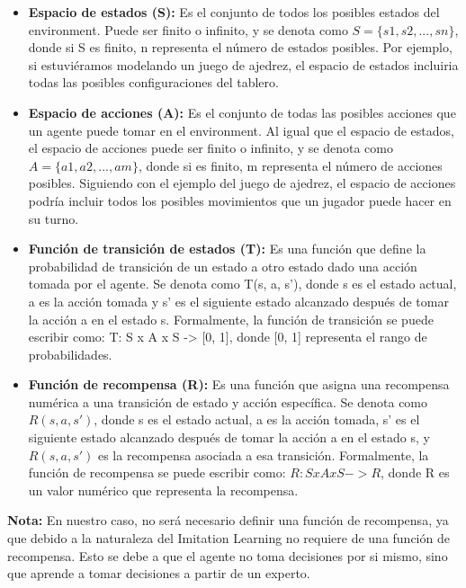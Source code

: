 \begin{itemize}
    \item \textbf{Espacio de estados (S):} Es el conjunto de todos los posibles estados del environment. 
    Puede ser finito o infinito, y se denota como $S = \{s1, s2, ..., sn\}$, donde si S es finito, n representa 
    el número de estados posibles. Por ejemplo, si estuviéramos modelando un juego de ajedrez, el espacio 
    de estados incluiria todas las posibles configuraciones del tablero.

    \item \textbf{Espacio de acciones (A):} Es el conjunto de todas las posibles acciones que un agente 
    puede tomar en el environment. Al igual que el espacio de estados, el espacio de acciones puede ser finito 
    o infinito, y se denota como $A = \{a1, a2, ..., am\}$, donde si es finito, m representa el número de 
    acciones posibles. Siguiendo con el ejemplo del juego de ajedrez, el espacio de acciones podría incluir 
    todos los posibles movimientos que un jugador puede hacer en su turno.

    \item \textbf{Función de transición de estados (T):} Es una función que define la probabilidad de transición 
    de un estado a otro estado dado una acción tomada por el agente. Se denota como T(s, a, s'), donde s es el 
    estado actual, a es la acción tomada y s' es el siguiente estado alcanzado después de tomar la acción a en 
    el estado s. Formalmente, la función de transición se puede escribir como: T: S x A x S -> [0, 1], donde 
    [0, 1] representa el rango de probabilidades.

    \item \textbf{Función de recompensa (R):} Es una función que asigna una recompensa numérica a una transición 
    de estado y acción específica. Se denota como $R(s, a, s')$, donde s es el estado actual, a es la acción tomada, 
    s' es el siguiente estado alcanzado después de tomar la acción a en el estado s, y $R(s, a, s')$ es 
    la recompensa asociada a esa transición. Formalmente, la función de recompensa se puede escribir 
    como: $R: S x A x S -> R$, donde R es un valor numérico que representa la recompensa. 
\end{itemize}

\textbf{Nota: } En nuestro caso, no será necesario definir una función de recompensa, ya que debido a la 
naturaleza del Imitation Learning no requiere de una función de recompensa. Esto se debe a que el agente 
no toma decisiones por si mismo, sino que aprende a tomar decisiones a partir de un experto.

